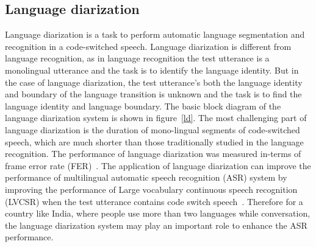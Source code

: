 \begin{spacing}{1.5}
\subsection{Language diarization}
Language diarization is a task to perform automatic language segmentation and recognition in a code-switched speech. Language diarization is different from language recognition, as in language recognition the test utterance is a monolingual utterance and the task is to identify the language identity. But in the case of language diarization, the test utterance's both the language identity and boundary of the language transition is unknown and the task is to find the language identity and language boundary. The basic block diagram of the language diarization system is shown in figure~\ref{ld}. The most challenging part of language diarization is the duration of mono-lingual segments of code-switched speech, which are much shorter than those traditionally studied in the language recognition. The performance of language diarization was measured in-terms of frame error rate (FER)~\cite{lyu2013language}. The application of language diarization can improve the performance of multilingual automatic speech recognition (ASR) system by improving the performance of Large vocabulary continuous speech recognition (LVCSR) when the test utterance contains code switch speech~\cite{lyu2013language}. Therefore for a country like India, where people use more than two languages while conversation, the language diarization system may play an important role to enhance the ASR performance.
 

\end{spacing}
